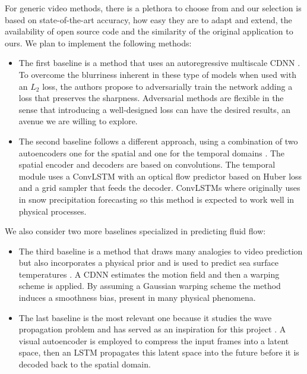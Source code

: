 \documentclass[a4paper,11pt]{article}
\begin{document}
For generic video methods, there is a plethora to choose from and our selection is based on state-of-the-art accuracy, how easy they are to adapt and extend, the availability of open source code and the similarity of the original application to ours. We plan to implement the following methods:
\begin{itemize}
    \item The first baseline is a method that uses an autoregressive multiscale CDNN \cite{mathieu2015deep}. To overcome the blurriness inherent in these type of models when used with an $L_2$ loss, the authors propose to adversarially train the network adding a loss that preserves the sharpness. Adversarial methods are flexible in the sense that introducing a well-designed loss can have the desired results, an avenue we are willing to explore.
    \item The second baseline follows a different approach, using a combination of two autoencoders one for the spatial and one for the temporal domains \cite{patraucean2015spatio}. The spatial encoder and decoders are based on convolutions. The temporal module uses a ConvLSTM \cite{xingjian2015convolutionalconvlstm} with an optical flow predictor based on Huber loss and a grid sampler that feeds the decoder. ConvLSTMs where originally uses in snow precipitation forecasting so this method is expected to work well in physical processes.
\end{itemize}

We also consider two more baselines specialized in predicting fluid flow:
\begin{itemize}
    \item The third baseline is a method that draws many analogies to video prediction but also incorporates a physical prior and is used to predict sea surface temperatures  \cite{bezenac2017deep}. A CDNN estimates the motion field and then a warping scheme is applied. By assuming a Gaussian warping scheme the method induces a smoothness bias, present in many physical phenomena.
    \item The last baseline is the most relevant one because it studies the wave propagation problem and has served as an inspiration for this project \cite{sorteberg2018approximating}. A visual autoencoder is employed to compress the input frames into a latent space, then an LSTM propagates this latent space into the future before it is decoded back to the spatial domain. 
\end{itemize}
\end{document}
